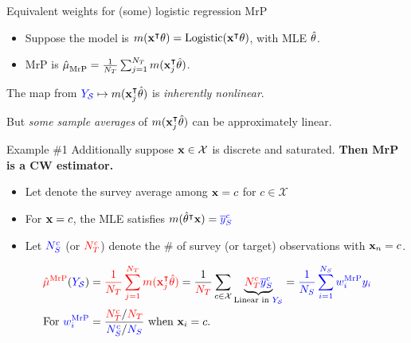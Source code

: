 \begin{frame}[t]{Equivalent weights for (some) logistic regression MrP}
%
\begin{itemize}
    \item Suppose the model is $m(\mathbf{x}^\intercal \theta) = \mathrm{Logistic}(\mathbf{x}^\intercal \theta)$, with MLE $\hat{\theta}$.
    \item MrP is $\hat{\mu}^{}_{\mathrm{MrP}} = \frac{1}{{N_T}} \sum_{j=1}^{N_T} m(\mathbf{x}_j^\intercal \hat{\theta})$.
\end{itemize}

The map from $\textcolor{blue}{Y_{\mathcal{S}}} \mapsto m(\mathbf{x}_j^\intercal \hat{\theta})$ is
\emph{inherently nonlinear}.

But \emph{some sample averages}
of $m(\mathbf{x}_j^\intercal \hat{\theta})$ can be approximately linear.\pause

\begin{block}{Example \#1}
Additionally suppose $\mathbf{x} \in \mathcal{X}$ is discrete and saturated.
        \textbf{Then MrP is a CW estimator.}
\end{block}

\pause
\def\ybar{\overline{y}}
\def\Ntarc{\tarcol{N_T^c}}
\def\Nsurc{\surcol{N_S^c}}
%
\begin{itemize}
    \item Let \surcol{$\ybar_S^c$} denote the survey average among $\mathbf{x} = c$ for $c \in \mathcal{X}$\pause
    \item For $\mathbf{x} = c$, the MLE satisfies $m(\thetahat^\trans \x) = \surcol{\ybar_S^c}$\pause
    \item Let $\Nsurc$ (or $\Ntarc$) denote the \# of survey (or target) observations with $\mathbf{x}_n = c$.\pause
\end{itemize}
%
$$
\begin{aligned}
\muhatmrp ={}& \tarcol{\meantar \m(\x_j^\trans \thetahat)}
            = \frac{1}{\tarcol{\Ntar}} \sum_{c \in \mathcal{X}}
            \underbrace{\Ntarc \surcol{\ybar_S^c}}_{\textrm{Linear in }\surcol{\Ysur}}
        = \surcol{\meansur \w_i^\mrp \y_i}
\\ \textrm{For }
\surcol{\w_i^\mrp} ={}&
    \frac{\Ntarc / \tarcol{\Ntar}}{\Nsurc / \surcol{\Nsur}} \textrm{ when }\x_i=c.
\end{aligned}
$$

\end{frame}


